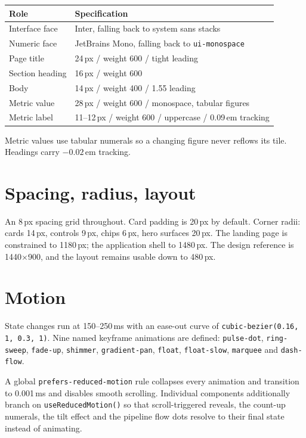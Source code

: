 \documentclass[11pt,a4paper]{report}
\newcommand{\code}[1]{\texttt{\small #1}}
\begin{document}
\begin{longtable}{L{4.4cm} L{10.4cm}}
\toprule
\textbf{Role} & \textbf{Specification} \\
\midrule
\endhead
Interface face & Inter, falling back to system sans stacks \\
Numeric face & JetBrains Mono, falling back to \code{ui-monospace} \\
Page title & 24\,px / weight 600 / tight leading \\
Section heading & 16\,px / weight 600 \\
Body & 14\,px / weight 400 / 1.55 leading \\
Metric value & 28\,px / weight 600 / monospace, tabular figures \\
Metric label & 11--12\,px / weight 600 / uppercase / 0.09\,em tracking \\
\bottomrule
\end{longtable}

Metric values use tabular numerals so a changing figure never reflows its
tile. Headings carry $-0.02$\,em tracking.

\section{Spacing, radius, layout}

An 8\,px spacing grid throughout. Card padding is 20\,px by default. Corner
radii: cards 14\,px, controls 9\,px, chips 6\,px, hero surfaces 20\,px. The
landing page is constrained to 1180\,px; the application shell to 1480\,px. The
design reference is 1440$\times$900, and the layout remains usable down to
480\,px.

\section{Motion}

State changes run at 150--250\,ms with an ease-out curve of
\code{cubic-bezier(0.16, 1, 0.3, 1)}. Nine named keyframe animations are
defined: \code{pulse-dot}, \code{ring-sweep}, \code{fade-up}, \code{shimmer},
\code{gradient-pan}, \code{float}, \code{float-slow}, \code{marquee} and
\code{dash-flow}.

A global \code{prefers-reduced-motion} rule collapses every animation and
transition to 0.001\,ms and disables smooth scrolling. Individual components
additionally branch on \code{useReducedMotion()} so that scroll-triggered
reveals, the count-up numerals, the tilt effect and the pipeline flow dots
resolve to their final state instead of animating.
\end{document}
